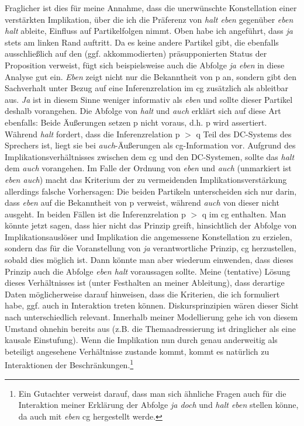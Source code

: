Fraglicher ist dies für meine Annahme, dass die unerwünschte Konstellation einer verstärkten Implikation, über die ich die Präferenz von \textit{halt eben} gegenüber \textit{eben halt} ableite, Einfluss auf Partikelfolgen nimmt. Oben habe ich angeführt, dass \textit{ja} stets am linken Rand auftritt. Da es keine andere Partikel gibt, die ebenfalls ausschließlich auf den (ggf. akkommodierten) präsupponierten Status der Proposition verweist, fügt sich beispielsweise auch die Abfolge \textit{ja eben} in diese Analyse gut ein. \textit{Eben} zeigt nicht nur die Bekanntheit von p an, sondern gibt den Sachverhalt unter Bezug auf eine Inferenzrelation im cg zusätzlich als ableitbar aus. \textit{Ja} ist in diesem Sinne weniger informativ als \textit{eben} und sollte dieser Partikel deshalb vorangehen. Die Abfolge von \textit{halt} und \textit{auch} erklärt sich auf diese Art ebenfalls: Beide Äußerungen setzen p nicht voraus, d.h. p wird assertiert. Während \textit{halt} fordert, dass die Inferenzrelation p $>$ q Teil des DC-Systems des Sprechers ist, liegt sie bei \textit{auch}-Äußerungen als cg-Information vor. Aufgrund des Implikationsverhältnisses zwischen dem cg und den DC-Systemen, sollte das \textit{halt} dem \textit{auch} vorangehen. Im Falle der Ordnung von \textit{eben} und \textit{auch} (unmarkiert ist \textit{eben auch}) macht das Kriterium der zu vermeidenden Implikationsverstärkung allerdings falsche Vorhersagen: Die beiden Partikeln unterscheiden sich nur darin, dass \textit{eben} auf die Bekanntheit von p verweist, während \textit{auch} von dieser nicht ausgeht. In beiden Fällen ist die Inferenzrelation p $>$ q im cg enthalten. Man könnte jetzt sagen, dass hier nicht das Prinzip greift, hinsichtlich der Abfolge von Implikationsauslöser und Implikation die angemessene Konstellation zu erzielen, sondern das für die Voranstellung von \textit{ja} verantwortliche Prinzip, cg herzustellen, sobald dies möglich ist. Dann könnte man aber wiederum einwenden, dass dieses Prinzip auch die Abfolge \textit{eben halt} voraussagen sollte. Meine (tentative) Lösung dieses Verhältnisses ist (unter Festhalten an meiner Ableitung), dass derartige Daten möglicherweise darauf hinweisen, dass die Kriterien, die ich formuliert habe, ggf. auch in Interaktion treten können. Diskursprinzipien wären dieser Sicht nach unterschiedlich relevant. Innerhalb meiner Modellierung gehe ich von diesem Umstand ohnehin bereits aus (z.B. die Themaadressierung ist \glq dringlicher\grqq{} als eine kausale Einstufung). Wenn die Implikation nun durch genau anderweitig als beteiligt angesehene Verhältnisse zustande kommt, kommt es natürlich zu Interaktionen der Beschränkungen.\footnote{Ein Gutachter verweist darauf, dass man sich ähnliche Fragen auch für die Interaktion meiner Erklärung der Abfolge \textit{ja doch} und \textit{halt eben} stellen könne, da auch mit \textit{eben} cg hergestellt werde.}

